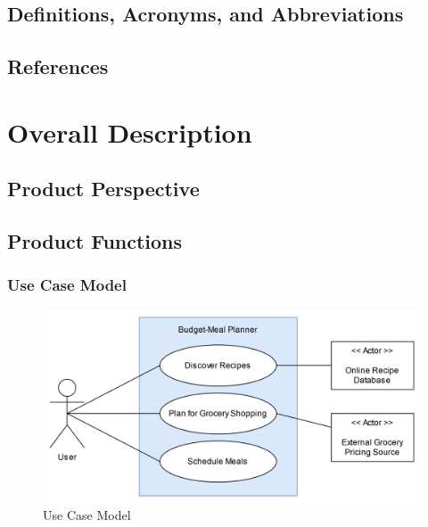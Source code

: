\documentclass[11pt, letterpaper]{report}
\begin{document}
\section{Definitions, Acronyms, and Abbreviations}

\section{References}

\chapter{Overall Description}

\section{Product Perspective}

\section{Product Functions}

\subsection{Use Case Model}
\begin{figure}[h]
    \centering
    \includegraphics[width=\textwidth]{images/Use_Case.png}
    \caption{Use Case Model}
\end{figure}
\end{document}
